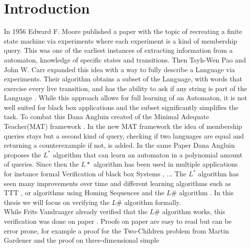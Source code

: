 \chapter{Introduction}
In 1956 Edward F. Moore published a paper with the topic of recreating a finite state machine via experiments\cite{gedankenexperiment} where each experiment is a kind of membership query. This was one of the earliest instances of extracting information from a automaton, knowledge of specific states and transitions. Then Tsyh-Wen Pao and John W. Carr expanded this idea with a way to fully describe a Language via experiments. Their algorithm obtains a subset of the Language, with words that exercise every live transition, and has the ability to ask if any string is part of the Language \cite{PAO197853}. While this approach allows for full learning of an Automaton, it is not well suited for black box applications and the subset significantly simplifies the task. To combat this Dana Angluin created of the Minimal Adequate Teacher(MAT) framework \cite{angluin}. In the new MAT framework the idea of membership queries stays but a second kind of query, checking if two languages are equal and returning a counterexample if not, is added. In the same Paper Dana Angluin proposes the $L^*$ algorithm that can learn an automaton in a polynomial amount of queries. Since then the $L*$ algorithm has been used in multiple applications for instance formal Verification of black box Systems \cite{Peled1999}, ... %
 The $L^*$ algorithm has seen many improvements over time \cite{} and different learning algorithms such as TTT \cite{10.1007/978-3-319-11164-3_26}, or algorithms using Homing Sequences \cite{RIVEST1993299} and the $L\#$ algorithm \cite{vandraagerlsharp}. In this thesis we will focus on verifying the $L\#$ algorithm formally. \\
While Frits Vandraager already verified that the $L\#$ algorithm works, this verification was done on paper \cite{vandraagerlsharp}. Proofs on paper are easy to read but can be error prone, for example a proof for the Two-Children problem from Martin Gardener and the proof on three-dimensional simple
